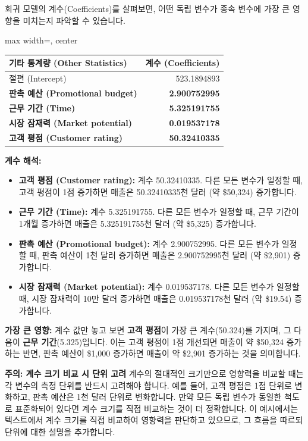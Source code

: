 \documentclass[11pt,a4paper]{article}
\theoremstyle{definition}
\begin{document}
\newpage
\begin{tcolorbox}[title=\textbf{가장 영향력 있는 변수 식별 (Most Impactful Variables)}]
회귀 모델의 계수(Coefficients)를 살펴보면, 어떤 독립 변수가 종속 변수에 가장 큰 영향을 미치는지 파악할 수 있습니다.

\begin{adjustbox}{max width=\textwidth, center}
\begin{tabular}{l r}
\toprule
\textbf{기타 통계량 (Other Statistics)} & \textbf{계수 (Coefficients)} \\
\midrule
절편 (Intercept) & 523.1894893 \\
\textbf{판촉 예산 (Promotional budget)} & \textbf{2.900752995} \\
\textbf{근무 기간 (Time)} & \textbf{5.325191755} \\
\textbf{시장 잠재력 (Market potential)} & \textbf{0.019537178} \\
\textbf{고객 평점 (Customer rating)} & \textbf{50.32410335} \\
\bottomrule
\end{tabular}
\end{adjustbox}

\textbf{계수 해석:}
\begin{itemize}
    \item \textbf{고객 평점 (Customer rating):} 계수 50.32410335. 다른 모든 변수가 일정할 때, 고객 평점이 1점 증가하면 매출은 50.32410335천 달러 (약 \$50,324) 증가합니다.
    \item \textbf{근무 기간 (Time):} 계수 5.325191755. 다른 모든 변수가 일정할 때, 근무 기간이 1개월 증가하면 매출은 5.325191755천 달러 (약 \$5,325) 증가합니다.
    \item \textbf{판촉 예산 (Promotional budget):} 계수 2.900752995. 다른 모든 변수가 일정할 때, 판촉 예산이 1천 달러 증가하면 매출은 2.900752995천 달러 (약 \$2,901) 증가합니다.
    \item \textbf{시장 잠재력 (Market potential):} 계수 0.019537178. 다른 모든 변수가 일정할 때, 시장 잠재력이 10만 달러 증가하면 매출은 0.019537178천 달러 (약 \$19.54) 증가합니다.
\end{itemize}

\textbf{가장 큰 영향:}
계수 값만 놓고 보면 \textbf{고객 평점}이 가장 큰 계수(50.324)를 가지며, 그 다음이 \textbf{근무 기간}(5.325)입니다. 이는 고객 평점이 1점 개선되면 매출이 약 \$50,324 증가하는 반면, 판촉 예산이 \$1,000 증가하면 매출이 약 \$2,901 증가하는 것을 의미합니다.

\begin{cautionbox}
\textbf{주의: 계수 크기 비교 시 단위 고려}
계수의 절대적인 크기만으로 영향력을 비교할 때는 각 변수의 측정 단위를 반드시 고려해야 합니다. 예를 들어, 고객 평점은 1점 단위로 변화하고, 판촉 예산은 1천 달러 단위로 변화합니다. 만약 모든 독립 변수가 동일한 척도로 표준화되어 있다면 계수 크기를 직접 비교하는 것이 더 정확합니다. 이 예시에서는 텍스트에서 계수 크기를 직접 비교하여 영향력을 판단하고 있으므로, 그 흐름을 따르되 단위에 대한 설명을 추가합니다.
\end{cautionbox}


\end{tcolorbox}
\end{document}
